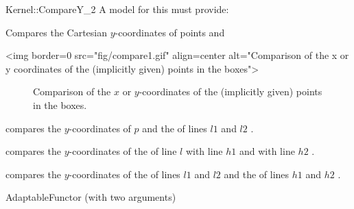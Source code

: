 \begin{ccRefFunctionObjectConcept}{Kernel::CompareY_2}
A model for this must provide:


      {Compares the Cartesian $y$-coordinates of points  and
      }

\begin{ccHtmlOnly}
<img border=0 src="fig/compare1.gif" align=center alt="Comparison of the x 
or y coordinates of the (implicitly given) points in the boxes">
\end{ccHtmlOnly} 

\begin{ccTexOnly}
\begin{figure}[h]
\centerline{}
\caption{Comparison of the $x$ or $y$-coordinates of the (implicitly
given) points in the boxes.\label{fig-compare14}}
\end{figure} 
\end{ccTexOnly} 


        {compares the $y$-coordinates of $p$ and the 
          of lines
         $l1$ and $l2$%
         .}


        {compares the $y$-coordinates of the  of line $l$
         with line $h1$ and with line $h2$%
         .}


        {compares the $y$-coordinates of the  of lines $l1$
         and $l2$ and  the  of lines $h1$ and $h2$ 
         .}


\ccRefines
AdaptableFunctor (with two arguments)

\ccSeeAlso
{} \\

\end{ccRefFunctionObjectConcept}
